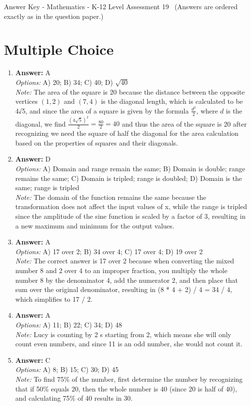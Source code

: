 \documentclass[12pt]{article}
\begin{document}
\begin{center}
Answer Key - Mathematics - K-12 Level Assessment 19 \
\small (Answers are ordered exactly as in the question paper.)
\end{center}

\section*{Multiple Choice}
\begin{enumerate}[label=\arabic*.]
\item \textbf{Answer:} A
\\ \textit{Options:} A) 20; B) 34; C) 40; D) \ensuremath{\sqrt{40}}
\\ \textit{Note:} The area of the square is 20 because the distance between the opposite vertices $(1,2)$ and $(7,4)$ is the diagonal length, which is calculated to be 4√5, and since the area of a square is given by the formula \( \frac{d^2}{2} \), where \( d \) is the diagonal, we find \( \frac{(4\sqrt{5})^2}{2} = \frac{80}{2} = 40 \) and thus the area of the square is 20 after recognizing we need the square of half the diagonal for the area calculation based on the properties of squares and their diagonals.
\item \textbf{Answer:} D
\\ \textit{Options:} A) Domain and range remain the same; B) Domain is double; range remains the same; C) Domain is tripled; range is doubled; D) Domain is the same; range is tripled
\\ \textit{Note:} The domain of the function remains the same because the transformation does not affect the input values of x, while the range is tripled since the amplitude of the sine function is scaled by a factor of 3, resulting in a new maximum and minimum for the output values.
\item \textbf{Answer:} A
\\ \textit{Options:} A) 17 over 2; B) 34 over 4; C) 17 over 4; D) 19 over 2
\\ \textit{Note:} The correct answer is 17 over 2 because when converting the mixed number 8 and 2 over 4 to an improper fraction, you multiply the whole number 8 by the denominator 4, add the numerator 2, and then place that sum over the original denominator, resulting in (8 * 4 + 2) / 4 = 34 / 4, which simplifies to 17 / 2.
\item \textbf{Answer:} A
\\ \textit{Options:} A) 11; B) 22; C) 34; D) 48
\\ \textit{Note:} Lucy is counting by 2 s starting from 2, which means she will only count even numbers, and since 11 is an odd number, she would not count it.
\item \textbf{Answer:} C
\\ \textit{Options:} A) 8; B) 15; C) 30; D) 45
\\ \textit{Note:} To find 75\% of the number, first determine the number by recognizing that if 50\% equals 20, then the whole number is 40 (since 20 is half of 40), and calculating 75\% of 40 results in 30.
\end{enumerate}
\end{document}

